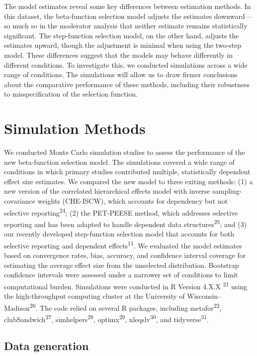 \documentclass[
  american,
  man, donotrepeattitle,floatsintext]{apa7}
\begin{document}
The model estimates reveal some key differences between estimation methods. In this dataset, the beta-function selection model adjusts the estimates downward---so much so in the moderator analysis that neither estimate remains statistically significant. The step-function selection model, on the other hand, adjusts the estimates upward, though the adjustment is minimal when using the two-step model. These differences suggest that the models may behave differently in different conditions. To investigate this, we conducted simulations across a wide range of conditions. The simulations will allow us to draw firmer conclusions about the comparative performance of these methods, including their robustness to misspecification of the selection function.

\section{Simulation Methods}\label{simulation-methods}

We conducted Monte Carlo simulation studies to assess the performance of the new beta-function selection model. The simulations covered a wide range of conditions in which primary studies contributed multiple, statistically dependent effect size estimates. We compared the new model to three exiting methods: (1) a new version of the correlated hierarchical effects model with inverse sampling-covariance weights (CHE-ISCW), which accounts for dependency but not selective reporting\textsuperscript{24}; (2) the PET-PEESE method, which addresses selective reporting and has been adapted to handle dependent data structures\textsuperscript{25}; and (3) our recently developed step-function selection model that accounts for both selective reporting and dependent effects\textsuperscript{11}. We evaluated the model estimates based on convergence rates, bias, accuracy, and confidence interval coverage for estimating the average effect size from the unselected distribution. Bootstrap confidence intervals were assessed under a narrower set of conditions to limit computational burden. Simulations were conducted in R Version 4.X.X \textsuperscript{21} using the high-throughput computing cluster at the University of Wisconsin--Madison\textsuperscript{26}. The code relied on several R packages, including metafor\textsuperscript{22}, clubSandwich\textsuperscript{27}, simhelpers\textsuperscript{28}, optimx\textsuperscript{29}, nleqslv\textsuperscript{30}, and tidyverse\textsuperscript{31}.

\subsection{Data generation}\label{data-generation}
\end{document}
